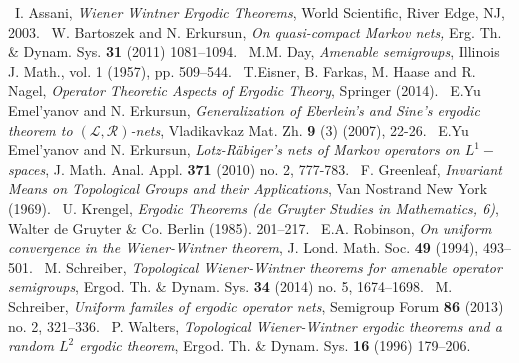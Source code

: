 \documentclass{amsart}
\theoremstyle{definition}
\theoremstyle{remark}
\numberwithin{equation}{section}
\begin{document}
\begin{thebibliography}{12}

\bibitem {} \ I. Assani, {\it Wiener Wintner Ergodic Theorems}, World Scientific, River Edge, NJ, 2003.
\bibitem {} \ W. Bartoszek and N. Erkursun, {\it On quasi-compact Markov nets,} Erg. Th. \& Dynam. Sys. {\bf 31} (2011) 1081--1094.
\bibitem {} \ M.M. Day, {\it Amenable semigroups}, Illinois J. Math., vol. 1 (1957), pp. 509--544.
\bibitem {} \ T.Eisner, B. Farkas, M. Haase and R. Nagel, {\it Operator Theoretic Aspects of Ergodic Theory}, Springer (2014).
\bibitem {} \ E.Yu Emel'yanov and N. Erkursun, {\it Generalization of Eberlein's and Sine's ergodic theorem to $(\mathcal{L}, \mathcal{R})$-nets}, Vladikavkaz Mat. Zh. {\bf 9} (3) (2007), 22-26.
\bibitem {} \ E.Yu Emel'yanov and N. Erkursun, {\it Lotz-R\"abiger's nets of Markov operators on $L^1-$spaces}, J. Math. Anal. Appl. {\bf 371} (2010) no. 2, 777-783.
\bibitem {} \ F. Greenleaf, {\it Invariant Means on Topological Groups and their Applications}, Van Nostrand New York (1969).
\bibitem {} \ U. Krengel, {\it Ergodic Theorems (de Gruyter Studies in Mathematics, 6)}, Walter de Gruyter \& Co. Berlin (1985). 201--217.
\bibitem {} \ E.A. Robinson, {\it On uniform convergence in the Wiener-Wintner theorem}, J. Lond. Math. Soc. {\bf 49} (1994), 493--501.
\bibitem {}  \ M. Schreiber, {\it Topological Wiener-Wintner theorems for amenable operator semigroups}, Ergod. Th. \& Dynam. Sys. {\bf 34} (2014) no. 5, 1674--1698.
\bibitem {} \ M. Schreiber, {\it Uniform familes of ergodic operator nets}, Semigroup Forum {\bf 86} (2013) no. 2, 321--336.
\bibitem {} \ P. Walters, {\it Topological Wiener-Wintner ergodic theorems and a random $L^2$ ergodic theorem}, Ergod. Th. \& Dynam. Sys. {\bf 16} (1996) 179--206.
\end{thebibliography}
\end{document}
